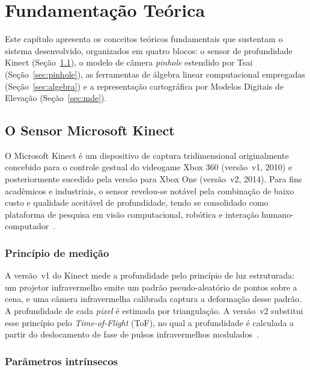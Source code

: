 
\chapter{Fundamentação Teórica}
\label{cap:fundamentacao}

Este capítulo apresenta os conceitos teóricos fundamentais que sustentam
o sistema desenvolvido, organizados em quatro blocos: o sensor de
profundidade Kinect (Seção~\ref{sec:kinect}), o modelo de câmera
\textit{pinhole} estendido por Tsai (Seção~\ref{sec:pinhole}), as
ferramentas de álgebra linear computacional empregadas
(Seção~\ref{sec:algebra}) e a representação cartográfica por Modelos
Digitais de Elevação (Seção~\ref{sec:mde}).

\section{O Sensor Microsoft Kinect}
\label{sec:kinect}

O Microsoft Kinect é um dispositivo de captura tridimensional
originalmente concebido para o controle gestual do videogame
Xbox 360 (versão~v1, 2010) e posteriormente sucedido pela
versão para Xbox One (versão~v2, 2014). Para fins acadêmicos e
industriais, o sensor revelou-se notável pela combinação de baixo custo
e qualidade aceitável de profundidade, tendo se consolidado como
plataforma de pesquisa em visão computacional, robótica e interação
humano-computador~\cite{zhang2012kinect}.

\subsection{Princípio de medição}
\label{subsec:tof}

A versão~v1 do Kinect mede a profundidade pelo princípio de
luz estruturada: um projetor infravermelho emite um padrão
pseudo-aleatório de pontos sobre a cena, e uma câmera infravermelha
calibrada captura a deformação desse padrão. A profundidade de cada
\emph{pixel} é estimada por triangulação. A versão~v2 substitui esse
princípio pelo \textit{Time-of-Flight} (ToF), no qual a profundidade é
calculada a partir do deslocamento de fase de pulsos infravermelhos
modulados~\cite{sell2014xbox}.

\subsection{Parâmetros intrínsecos}
\label{subsec:intrinsecos-kinect}

